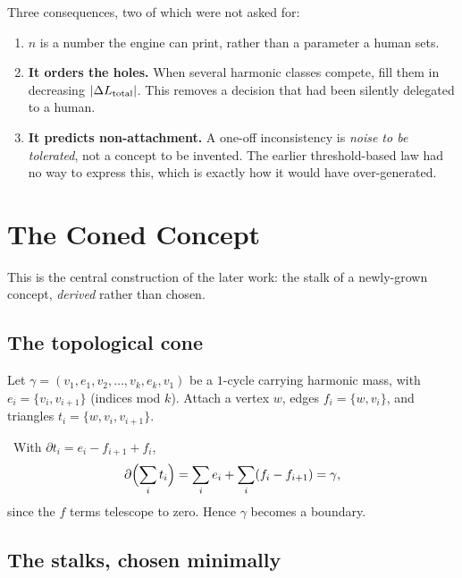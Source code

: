 Three consequences, two of which were not asked for:

\begin{enumerate}
  \item $n$ is a number the engine can print, rather than a parameter a
        human sets.
  \item \textbf{It orders the holes.} When several harmonic classes
        compete, fill them in decreasing $\left\lvert \Delta L_{\text{total}} \right\rvert$.
        This removes a decision that had been silently delegated to a
        human.
  \item \textbf{It predicts non-attachment.} A one-off inconsistency is
        \emph{noise to be tolerated}, not a concept to be invented. The
        earlier threshold-based law had no way to express this, which is
        exactly how it would have over-generated.
\end{enumerate}

\chapter{The Coned Concept}\label{ch:cone}

This is the central construction of the later work: the stalk of a
newly-grown concept, \emph{derived} rather than chosen.

\section{The topological cone}

\begin{construction}\label{con:conetopo}
Let $\gamma=(v_1,e_1,v_2,\dots,v_k,e_k,v_1)$ be a $1$-cycle carrying
harmonic mass, with $e_i=\{v_i,v_{i+1}\}$ (indices mod $k$). Attach a
vertex $w$, edges $f_i=\{w,v_i\}$, and triangles
$t_i=\{w,v_i,v_{i+1}\}$.
\end{construction}

\begin{proposition}\label{prop:conekills}
\Proved\ With $\partial t_i=e_i-f_{i+1}+f_i$,
\[
  \partial\Bigl(\sum_i t_i\Bigr)
  =\sum_i e_i+\sum_i(f_i-f_{i+1})=\gamma,
\]
since the $f$ terms telescope to zero. Hence $\gamma$ becomes a
boundary.
\end{proposition}

\section{The stalks, chosen minimally}

